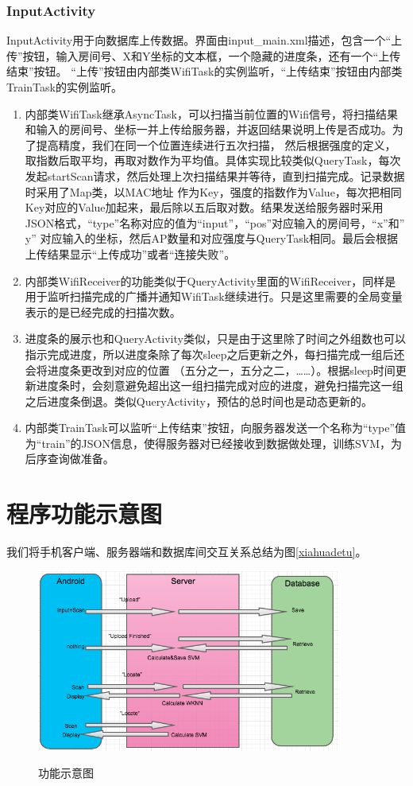 \documentclass[a4paper,10pt]{article}
\begin{document}
\begin{CJK*}{UTF8}{gbsn}
    \subsubsection{InputActivity}
    InputActivity用于向数据库上传数据。界面由input\_main.xml描述，包含一个``上传''按钮，输入房间号、X和Y坐标的文本框，一个隐藏的进度条，还有一个``上传结束''按钮。
    ``上传''按钮由内部类WifiTask的实例监听，``上传结束''按钮由内部类TrainTask的实例监听。
    \begin{enumerate}[1)]
     \item 内部类WifiTask继承AsyncTask，可以扫描当前位置的Wifi信号，将扫描结果和输入的房间号、坐标一并上传给服务器，并返回结果说明上传是否成功。为了提高精度，我们在同一个位置连续进行五次扫描，
     然后根据强度的定义，取指数后取平均，再取对数作为平均值。具体实现比较类似QueryTask，每次发起startScan请求，然后处理上次扫描结果并等待，直到扫描完成。记录数据时采用了Map类，以MAC地址
     作为Key，强度的指数作为Value，每次把相同Key对应的Value加起来，最后除以五后取对数。结果发送给服务器时采用JSON格式，``type''名称对应的值为``input''，``pos''对应输入的房间号，``x''和'' y''
     对应输入的坐标，然后AP数量和对应强度与QueryTask相同。最后会根据上传结果显示``上传成功''或者``连接失败''。
     \item 内部类WifiReceiver的功能类似于QueryActivity里面的WifiReceiver，同样是用于监听扫描完成的广播并通知WifiTask继续进行。只是这里需要的全局变量表示的是已经完成的扫描次数。
     \item 进度条的展示也和QueryActivity类似，只是由于这里除了时间之外组数也可以指示完成进度，所以进度条除了每次sleep之后更新之外，每扫描完成一组后还会将进度条更改到对应的位置
     （五分之一，五分之二，……）。根据sleep时间更新进度条时，会刻意避免超出这一组扫描完成对应的进度，避免扫描完这一组之后进度条倒退。类似QueryActivity，预估的总时间也是动态更新的。
     \item 内部类TrainTask可以监听``上传结束''按钮，向服务器发送一个名称为``type''值为``train''的JSON信息，使得服务器对已经接收到数据做处理，训练SVM，为后序查询做准备。
    \end{enumerate}

\section{程序功能示意图}
我们将手机客户端、服务器端和数据库间交互关系总结为图\eqref{xiahuadetu}。
\begin{figure}[htbp]
\centering
\includegraphics[width=10cm]{xiahuadetu.png}
   　　\caption{功能示意图}
   \label{xiahuadetu}
\end{figure}





\end{CJK*}
\end{document}
